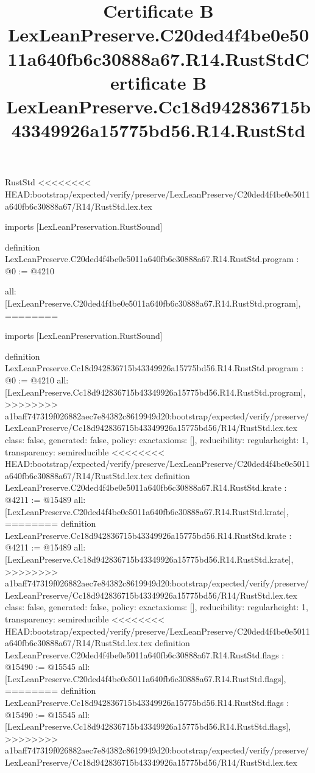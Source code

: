 \begin{lexlean}{RustStd}
<<<<<<<< HEAD:bootstrap/expected/verify/preserve/LexLeanPreserve/C20ded4f4be0e5011a640fb6c30888a67/R14/RustStd.lex.tex
\title{Certificate B LexLeanPreserve.C20ded4f4be0e5011a640fb6c30888a67.R14.RustStd}
\begin{coremodule}
imports [LexLeanPreservation.RustSound]

definition LexLeanPreserve.C20ded4f4be0e5011a640fb6c30888a67.R14.RustStd.program : @0 := @4210 {
  all: [LexLeanPreserve.C20ded4f4be0e5011a640fb6c30888a67.R14.RustStd.program],
========
\title{Certificate B LexLeanPreserve.Cc18d942836715b43349926a15775bd56.R14.RustStd}
\begin{coremodule}
imports [LexLeanPreservation.RustSound]

definition LexLeanPreserve.Cc18d942836715b43349926a15775bd56.R14.RustStd.program : @0 := @4210 {
  all: [LexLeanPreserve.Cc18d942836715b43349926a15775bd56.R14.RustStd.program],
>>>>>>>> a1baff747319f026882aec7e84382c8619949d20:bootstrap/expected/verify/preserve/LexLeanPreserve/Cc18d942836715b43349926a15775bd56/R14/RustStd.lex.tex
  class: false,
  generated: false,
  policy: exact{axioms: []},
  reducibility: regular{height: 1},
  transparency: semireducible
}
<<<<<<<< HEAD:bootstrap/expected/verify/preserve/LexLeanPreserve/C20ded4f4be0e5011a640fb6c30888a67/R14/RustStd.lex.tex
definition LexLeanPreserve.C20ded4f4be0e5011a640fb6c30888a67.R14.RustStd.krate : @4211 := @15489 {
  all: [LexLeanPreserve.C20ded4f4be0e5011a640fb6c30888a67.R14.RustStd.krate],
========
definition LexLeanPreserve.Cc18d942836715b43349926a15775bd56.R14.RustStd.krate : @4211 := @15489 {
  all: [LexLeanPreserve.Cc18d942836715b43349926a15775bd56.R14.RustStd.krate],
>>>>>>>> a1baff747319f026882aec7e84382c8619949d20:bootstrap/expected/verify/preserve/LexLeanPreserve/Cc18d942836715b43349926a15775bd56/R14/RustStd.lex.tex
  class: false,
  generated: false,
  policy: exact{axioms: []},
  reducibility: regular{height: 1},
  transparency: semireducible
}
<<<<<<<< HEAD:bootstrap/expected/verify/preserve/LexLeanPreserve/C20ded4f4be0e5011a640fb6c30888a67/R14/RustStd.lex.tex
definition LexLeanPreserve.C20ded4f4be0e5011a640fb6c30888a67.R14.RustStd.flags : @15490 := @15545 {
  all: [LexLeanPreserve.C20ded4f4be0e5011a640fb6c30888a67.R14.RustStd.flags],
========
definition LexLeanPreserve.Cc18d942836715b43349926a15775bd56.R14.RustStd.flags : @15490 := @15545 {
  all: [LexLeanPreserve.Cc18d942836715b43349926a15775bd56.R14.RustStd.flags],
>>>>>>>> a1baff747319f026882aec7e84382c8619949d20:bootstrap/expected/verify/preserve/LexLeanPreserve/Cc18d942836715b43349926a15775bd56/R14/RustStd.lex.tex
}}}
\end{coremodule}}
\end{coremodule}
\end{lexlean}
